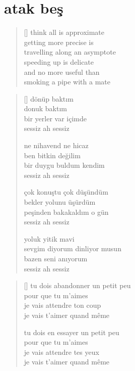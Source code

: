 \documentclass[10pt, openright, twoside]{memoir}
\theoremstyle{definition}
\begin{document}
\chapter{atak beş}
\vspace*{\fill}
\settowidth{\versewidth}{travelling along an asymptote}
\begin{verse}[\versewidth]
  think all is approximate \\
  getting more precise is \\
  travelling along an asymptote \\
  speeding up is delicate \\
  and no more useful than \\
  smoking a pipe with a mate \\
\end{verse}
\vspace*{\fill}
%
\newpage
{}
\vspace*{\fill}
\settowidth{\versewidth}{sevgim diyorum dinliyor musun}
\begin{verse}[\versewidth]
  dönüp baktım \\
  donuk baktım \\
  bir yerler var içimde \\
  sessiz ah sessiz

  ne nihavend ne hicaz \\
  ben bitkin değilim \\
  bir duygu buldum kendim \\
  sessiz ah sessiz

  çok konuştu çok düşündüm \\
  bekler yolunu üşürdüm \\
  peşinden bakakaldım o gün \\
  sessiz ah sessiz

  yoluk yitik mavi \\
  sevgim diyorum dinliyor musun \\
  bazen seni anıyorum \\
  sessiz ah sessiz
\end{verse}
\vspace*{\fill}
%
\newpage
{}
\vspace*{\fill}
\settowidth{\versewidth}{tu dois abandonner un petit peu}
\begin{verse}[\versewidth]
  tu dois abandonner un petit peu \\
  pour que tu m'aimes \\
  je vais attendre ton coup \\
  je vais t'aimer quand même

  tu dois en essayer un petit peu \\
  pour que tu m'aimes \\
  je vais attendre tes yeux \\
  je vais t'aimer quand même
\end{verse}
\end{document}

